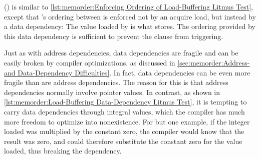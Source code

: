 \begin{listing}[tbp]

\caption{Load-Buffering Data-Dependency Litmus Test}
\label{lst:memorder:Load-Buffering Data-Dependency Litmus Test}
\end{listing}

\begin{fcvref}
()
is similar to
\cref{lst:memorder:Enforcing Ordering of Load-Buffering Litmus Test},
except that 's ordering between  is
enforced not by an acquire load, but instead by a data dependency:
The value loaded by  is what  stores.
The ordering provided by this data dependency is sufficient to prevent
the  clause from triggering.
\end{fcvref}

Just as with address dependencies, data dependencies are
fragile and can be easily broken by compiler optimizations, as discussed in
\cref{sec:memorder:Address- and Data-Dependency Difficulties}.
In fact, data dependencies can be even more fragile than are address
dependencies.
The reason for this is that address dependencies normally involve
pointer values.
In contrast, as shown in
\cref{lst:memorder:Load-Buffering Data-Dependency Litmus Test},
it is tempting to carry data dependencies through integral values,
which the compiler has much more freedom to optimize into nonexistence.
For but one example, if the integer loaded was multiplied by the constant
zero, the compiler would know that the result was zero, and could therefore
substitute the constant zero for the value loaded, thus breaking
the dependency.

\QuickQuizEnd

